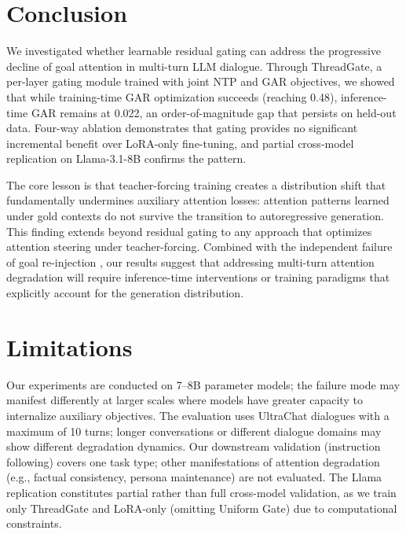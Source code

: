 \documentclass[11pt,a4paper]{article}
\begin{document}
\section{Conclusion}

We investigated whether learnable residual gating can address the progressive decline of goal attention in multi-turn LLM dialogue. Through ThreadGate, a per-layer gating module trained with joint NTP and GAR objectives, we showed that while training-time GAR optimization succeeds (reaching 0.48), inference-time GAR remains at 0.022, an order-of-magnitude gap that persists on held-out data. Four-way ablation demonstrates that gating provides no significant incremental benefit over LoRA-only fine-tuning, and partial cross-model replication on Llama-3.1-8B confirms the pattern.

The core lesson is that teacher-forcing training creates a distribution shift that fundamentally undermines auxiliary attention losses: attention patterns learned under gold contexts do not survive the transition to autoregressive generation. This finding extends beyond residual gating to any approach that optimizes attention steering under teacher-forcing. Combined with the independent failure of goal re-injection \cite{dongre2026}, our results suggest that addressing multi-turn attention degradation will require inference-time interventions or training paradigms that explicitly account for the generation distribution.

\section*{Limitations}

Our experiments are conducted on 7--8B parameter models; the failure mode may manifest differently at larger scales where models have greater capacity to internalize auxiliary objectives. The evaluation uses UltraChat dialogues with a maximum of 10 turns; longer conversations or different dialogue domains may show different degradation dynamics. Our downstream validation (instruction following) covers one task type; other manifestations of attention degradation (e.g., factual consistency, persona maintenance) are not evaluated. The Llama replication constitutes partial rather than full cross-model validation, as we train only ThreadGate and LoRA-only (omitting Uniform Gate) due to computational constraints.



\end{document}
